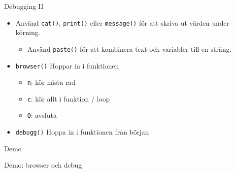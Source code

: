 \documentclass[
  11pt,
  ignorenonframetext,
]{beamer}
\providecommand{\tightlist}{%
  \setlength{\itemsep}{0pt}\setlength{\parskip}{0pt}}
\begin{document}
\begin{frame}{Debugging II}
\label{debugging-ii}
\begin{itemize}
\tightlist
\item
  Använd \texttt{cat()}, \texttt{print()} eller \texttt{message()} för
  att skriva ut värden under körning.

  \begin{itemize}
  \tightlist
  \item
    Använd \texttt{paste()} för att kombinera text och variabler till en
    sträng.
  \end{itemize}
\item
  \texttt{browser()} Hoppar in i funktionen

  \begin{itemize}
  \tightlist
  \item
    \texttt{n}: kör nästa rad
  \item
    \texttt{c}: kör allt i funktion / loop
  \item
    \texttt{Q}: avsluta
  \end{itemize}
\item
  \texttt{debugg()} Hoppa in i funktionen från början
\end{itemize}
\end{frame}

\begin{frame}{Demo}
\label{demo-5}
\begin{block}{Demo: browser och debug}
\label{demo-browser-och-debug}
\end{block}
\end{frame}
\end{document}
